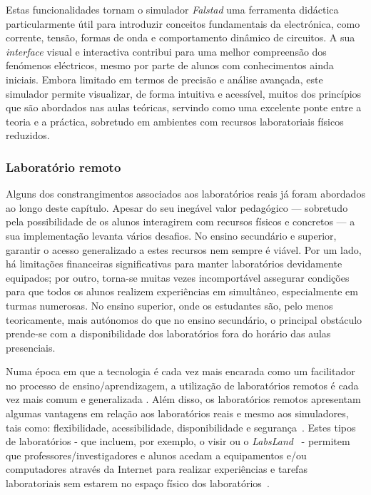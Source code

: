Estas funcionalidades tornam o simulador \textit{Falstad} uma ferramenta didáctica particularmente útil para introduzir conceitos fundamentais da electrónica, como corrente, tensão, formas de onda e comportamento dinâmico de circuitos. A sua \textit{interface} visual e interactiva contribui para uma melhor compreensão dos fenómenos eléctricos, mesmo por parte de alunos com conhecimentos ainda iniciais. Embora limitado em termos de precisão e análise avançada, este simulador permite visualizar, de forma intuitiva e acessível, muitos dos princípios que são abordados nas aulas teóricas, servindo como uma excelente ponte entre a teoria e a práctica, sobretudo em ambientes com recursos laboratoriais físicos reduzidos.

\subsubsection{Laboratório remoto}
\label{sec: remotelaboratory}
Alguns dos constrangimentos associados aos laboratórios reais já foram abordados ao longo deste capítulo. Apesar do seu inegável valor pedagógico — sobretudo pela possibilidade de os alunos interagirem com recursos físicos e concretos — a sua implementação levanta vários desafios. No ensino secundário e superior, garantir o acesso generalizado a estes recursos nem sempre é viável. Por um lado, há limitações financeiras significativas para manter laboratórios devidamente equipados; por outro, torna-se muitas vezes incomportável assegurar condições para que todos os alunos realizem experiências em simultâneo, especialmente em turmas numerosas. No ensino superior, onde os estudantes são, pelo menos teoricamente, mais autónomos do que no ensino secundário, o principal obstáculo prende-se com a disponibilidade dos laboratórios fora do horário das aulas presenciais.

Numa época em que a tecnologia é cada vez mais encarada como um facilitador no processo de ensino/aprendizagem, a utilização de laboratórios remotos é cada vez mais comum e generalizada \cite{RemoteLabsImpactVISIR}. Além disso, os laboratórios remotos apresentam algumas vantagens em relação aos laboratórios reais e mesmo aos simuladores, tais como: flexibilidade, acessibilidade, disponibilidade e segurança~\cite{RemoteLabsImpactVISIR}. Estes tipos de laboratórios - que incluem, por exemplo, o \acrshort{visir} ou o \textit{LabsLand}~\cite{labsland} - permitem que professores/investigadores e alunos acedam a equipamentos e/ou computadores através da Internet para realizar experiências e tarefas laboratoriais sem estarem no espaço físico dos laboratórios~\cite{ExperiencesRemoteLab}.


